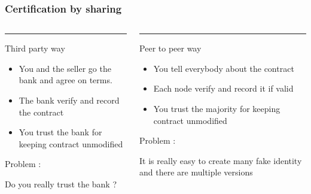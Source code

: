 \documentclass[12pt]{beamer}
\begin{document}
\begin{frame}
\frametitle{Certification by sharing}
\begin{center}
\vspace{-3mm}
\begin{columns}[T]
        \begin{column}{.48\textwidth}
            {\color{blue}\rule{\linewidth}{4pt}

            Third party way}
            \begin{itemize}
            \item You and the seller go the bank and agree on terms.
            \item The bank verify and record the contract
            \item You trust the bank for keeping contract unmodified
            \end{itemize}
            
            {\color{red} Problem :}
            
            Do you really trust the bank ?

        \end{column}
        \hfill
        \begin{column}{.48\linewidth}
            {\color{green!40!black}\rule{\linewidth}{4pt}

            Peer to peer way}
            
            \begin{itemize}
            \item You tell everybody about the contract
            \item Each node verify and record it if valid
            \item You trust the majority for keeping contract unmodified
            \end{itemize}           
            
            {\color{red} Problem :}
            
            It is really easy to create many fake identity and there are multiple versions

        \end{column}
    \end{columns}

\end{center}

\end{frame}
\end{document}
